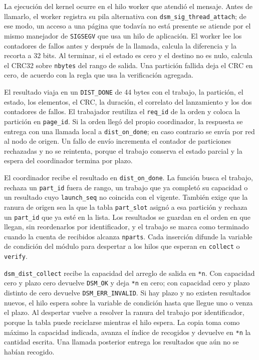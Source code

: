 La ejecución del kernel ocurre en el hilo worker que atendió el mensaje. Antes de llamarlo, el worker registra su pila alternativa con \texttt{dsm\_sig\_thread\_attach}; de ese modo, un acceso a una página que todavía no está presente se atiende por el mismo manejador de \texttt{SIGSEGV} que usa un hilo de aplicación. El worker lee los contadores de fallos antes y después de la llamada, calcula la diferencia y la recorta a 32 bits. Al terminar, si el estado es cero y el destino no es nulo, calcula el CRC32 sobre \texttt{nbytes} del rango de salida. Una partición fallida deja el CRC en cero, de acuerdo con la regla que usa la verificación agregada.

El resultado viaja en un \texttt{DIST\_DONE} de 44 bytes con el trabajo, la partición, el estado, los elementos, el CRC, la duración, el correlato del lanzamiento y los dos contadores de fallos. El trabajador reutiliza el \texttt{req\_id} de la orden y coloca la partición en \texttt{page\_id}. Si la orden llegó del propio coordinador, la respuesta se entrega con una llamada local a \texttt{dist\_on\_done}; en caso contrario se envía por red al nodo de origen. Un fallo de envío incrementa el contador de particiones rechazadas y no se reintenta, porque el trabajo conserva el estado parcial y la espera del coordinador termina por plazo.

El coordinador recibe el resultado en \texttt{dist\_on\_done}. La función busca el trabajo, rechaza un \texttt{part\_id} fuera de rango, un trabajo que ya completó su capacidad o un resultado cuyo \texttt{launch\_seq} no coincida con el vigente. También exige que la ranura de origen sea la que la tabla \texttt{part\_slot} asignó a esa partición y rechaza un \texttt{part\_id} que ya esté en la lista. Los resultados se guardan en el orden en que llegan, sin reordenarlos por identificador, y el trabajo se marca como terminado cuando la cuenta de recibidos alcanza \texttt{nparts}. Cada inserción difunde la variable de condición del módulo para despertar a los hilos que esperan en \texttt{collect} o \texttt{verify}.

\texttt{dsm\_dist\_collect} recibe la capacidad del arreglo de salida en \texttt{*n}. Con capacidad cero y plazo cero devuelve \texttt{DSM\_OK} y deja \texttt{*n} en cero; con capacidad cero y plazo distinto de cero devuelve \texttt{DSM\_ERR\_INVALID}. Si hay plazo y no existen resultados nuevos, el hilo espera sobre la variable de condición hasta que llegue uno o venza el plazo. Al despertar vuelve a resolver la ranura del trabajo por identificador, porque la tabla puede reciclarse mientras el hilo espera. La copia toma como máximo la capacidad indicada, avanza el índice de recogidos y devuelve en \texttt{*n} la cantidad escrita. Una llamada posterior entrega los resultados que aún no se habían recogido.

